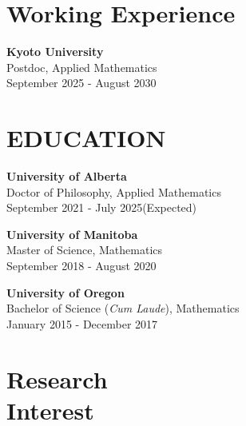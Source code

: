 \documentclass[margin]{res}
\begin{document}
\begin{resume}


\section{Working Experience}
\textbf{Kyoto University}\\
Postdoc, Applied Mathematics\\
September 2025 - August 2030 














\section{EDUCATION}
\textbf{University of Alberta}\\
Doctor of Philosophy, Applied Mathematics\\
September 2021 - July 2025(Expected)


\textbf{University of Manitoba}\\
Master of Science, Mathematics\\
September 2018 - August 2020 


\textbf{University of Oregon} \\
Bachelor of Science ({\sl Cum Laude}), Mathematics\\
January 2015 - December 2017





\section{Research\\Interest}


\end{resume}
\end{document}
